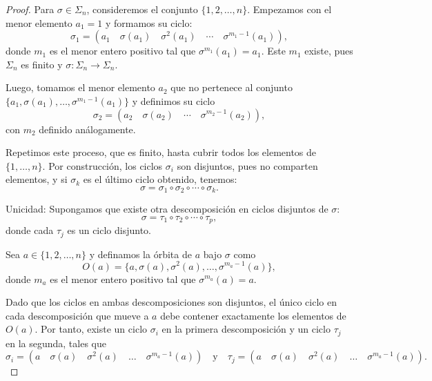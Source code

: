 \begin{proposicion}\label{poiuyhgf}
\end{proposicion}
\begin{proof}
	Para \(\sigma \in \Sigma_n\), consideremos el conjunto \(\{1, 2, \ldots, n\}\). Empezamos con el menor elemento \(a_1 = 1\) y formamos su ciclo:
	\[
	\sigma_1 = (a_1 \quad \sigma(a_1) \quad \sigma^2(a_1) \quad \cdots \quad \sigma^{m_1 - 1}(a_1)),
	\]
	donde \(m_1\) es el menor entero positivo tal que \(\sigma^{m_1}(a_1) = a_1\). Este \(m_1\) existe, pues \(\Sigma_n\) es finito y \(\sigma: \Sigma_n \to \Sigma_n\).
	
	\medskip
	\noindent Luego, tomamos el menor elemento \(a_2\) que no pertenece al conjunto \(\{a_1, \sigma(a_1), \ldots, \sigma^{m_1 - 1}(a_1)\}\) y definimos su ciclo
	\[
	\sigma_2 = (a_2 \quad \sigma(a_2) \quad \cdots \quad \sigma^{m_2 - 1}(a_2)),
	\]
	con \(m_2\) definido análogamente.
	
	\medskip
	\noindent
	Repetimos este proceso, que es finito, hasta cubrir todos los elementos de \(\{1, \ldots, n\}\). Por construcción, los ciclos \(\sigma_i\) son disjuntos, pues no comparten elementos, y si \(\sigma_k\) es el último ciclo obtenido, tenemos:
	\[
	\sigma = \sigma_1 \circ \sigma_2 \circ \cdots \circ \sigma_k.
	\]
	
	\medskip
	\noindent
	\vspace{1ex}
	Unicidad: Supongamos que existe otra descomposición en ciclos disjuntos de \(\sigma\):
	\[
	\sigma = \tau_1 \circ \tau_2 \circ \cdots \circ \tau_p,
	\]
	donde cada \(\tau_j\) es un ciclo disjunto.
	
	\medskip
	\noindent
	Sea \(a \in \{1,2,\dots,n\}\) y definamos la órbita de \(a\) bajo \(\sigma\) como
	\[
	O(a) = \{a, \sigma(a), \sigma^2(a), \dots, \sigma^{m_a -1}(a)\},
	\]
	donde \(m_a\) es el menor entero positivo tal que \(\sigma^{m_a}(a) = a\).
	
	\medskip
	\noindent
	Dado que los ciclos en ambas descomposiciones son disjuntos, el único ciclo en cada descomposición que mueve a \(a\) debe contener exactamente los elementos de \(O(a)\). Por tanto, existe un ciclo \(\sigma_i\) en la primera descomposición y un ciclo \(\tau_j\) en la segunda, tales que
	\[
	\sigma_i = (a \quad \sigma(a) \quad \sigma^2(a) \quad \dots \quad \sigma^{m_a -1}(a)) \quad \text{y} \quad \tau_j = (a \quad \sigma(a) \quad \sigma^2(a) \quad \dots \quad \sigma^{m_a -1}(a)).
	\]
	

\end{proof}
